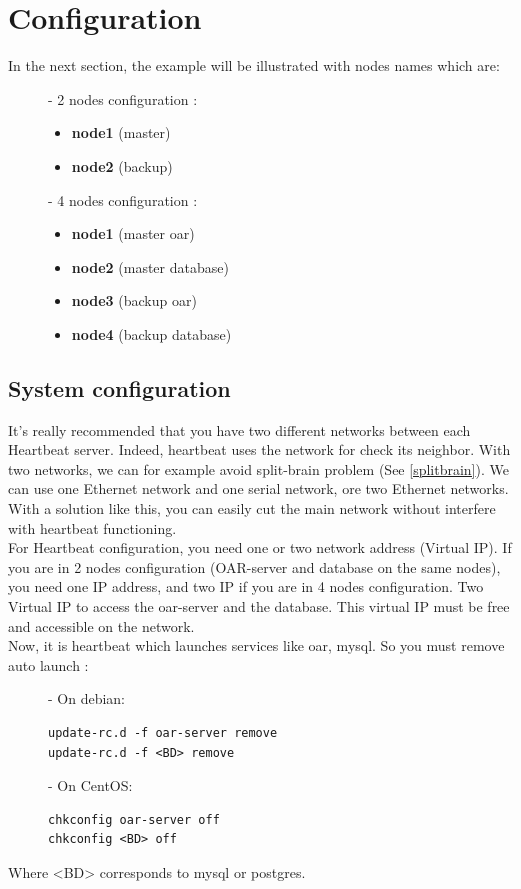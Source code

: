 \documentclass[a4paper,10pt]{report}
\begin{document}
\chapter{Configuration}

In the next section, the example will be illustrated with nodes names which are:
\begin{description}
\item[]- 2 nodes configuration : 
\begin{itemize}
\item \textbf{node1} (master)
\item \textbf{node2} (backup)
\end{itemize}

\item[]- 4 nodes configuration :
\begin{itemize}
\item \textbf{node1} (master oar)
\item \textbf{node2} (master database)
\item \textbf{node3} (backup oar)
\item \textbf{node4} (backup database)
\end{itemize}
\end{description}


\section{System configuration}
\label{sysconf}
It's really recommended that you have two different networks between each Heartbeat server. Indeed, heartbeat uses the network for check its neighbor. With two networks, we can for example avoid split-brain problem (See \ref{splitbrain}). We can use one Ethernet network and one serial network, ore two Ethernet networks. With a solution like this, you can easily cut the main network without interfere with heartbeat functioning.\\

For Heartbeat configuration, you need one or two network address (Virtual IP). If you are in 2 nodes configuration (OAR-server and database on the same nodes), you need one IP address, and two IP if you are in 4 nodes configuration. Two Virtual IP to access the oar-server and the database. This virtual IP must be free and accessible on the network.\\

Now, it is heartbeat which launches services like oar, mysql. So you must remove auto launch :
\begin{description}
\item[]- On debian:
\begin{lstlisting}
update-rc.d -f oar-server remove
update-rc.d -f <BD> remove
\end{lstlisting}
\item[]- On CentOS:
\begin{lstlisting}
chkconfig oar-server off
chkconfig <BD> off
\end{lstlisting}
\end{description}
Where <BD> corresponds to mysql or postgres.\\
\end{document}
